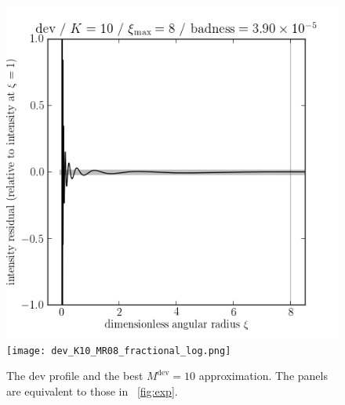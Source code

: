 \documentclass[12pt,pdftex,preprint]{aastex}
\newlength{\figurewidth}
\newcommand{\dev}{\mathrm{dev}}
\begin{document}
\begin{figure}
\includegraphics[width=\figurewidth]{dev_K10_MR08_residual.png}%
\texttt{[image: dev\_K10\_MR08\_fractional\_log.png]}
\caption{The dev profile and the best $M^{\dev}=10$ approximation.
  The panels are equivalent to those in \figurename~\ref{fig:exp}.}
\end{figure}
\end{document}
